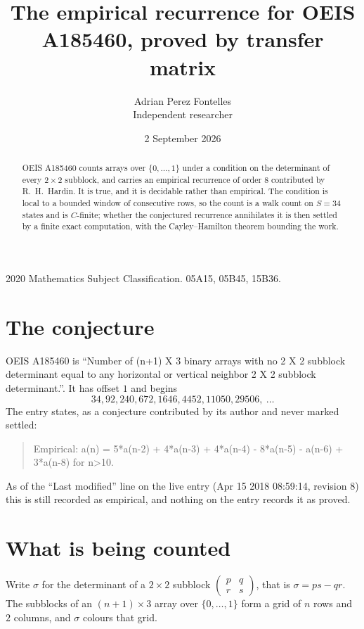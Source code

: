 \documentclass[11pt,a4paper]{article}
\title{The empirical recurrence for OEIS A185460, proved by transfer matrix}
\author{Adrian Perez Fontelles\\ \small Independent researcher}
\date{2 September 2026}
\theoremstyle{plain}
\theoremstyle{definition}
\begin{document}
\maketitle

\begin{abstract}
OEIS A185460 counts arrays over $\{0,\dots,1\}$ under a condition on the determinant of every
$2\times2$ subblock, and carries an empirical recurrence of order $8$ contributed by
R.~H.~Hardin. It is true, and it is decidable rather than empirical. The condition is local to
a bounded window of consecutive rows, so the count is a walk count on $S=34$ states and is
$C$-finite; whether the conjectured recurrence annihilates it is then settled by a finite exact
computation, with the Cayley--Hamilton theorem bounding the work.
\end{abstract}

\noindent\small 2020 Mathematics Subject Classification. 05A15, 05B45, 15B36.\normalsize

\section{The conjecture}

OEIS A185460 is ``Number of (n+1) X 3 binary arrays with no 2 X 2 subblock determinant equal to any horizontal or vertical neighbor 2 X 2 subblock determinant.''. It has offset $1$ and begins
\[
34, 92, 240, 672, 1646, 4452, 11050, 29506,\ \dots
\]
The entry states, as a conjecture contributed by its author and never marked settled:
\begin{quote}
Empirical: a(n) = 5*a(n-2) + 4*a(n-3) + 4*a(n-4) - 8*a(n-5) - a(n-6) + 3*a(n-8) for n>10.
\end{quote}
As of the ``Last modified'' line on the live entry (Apr 15 2018 08:59:14, revision 8) this is still
recorded as empirical, and nothing on the entry records it as proved.

\section{What is being counted}

Write $\sigma$ for the determinant of a $2\times2$ subblock
$\begin{pmatrix}p&q\\r&s\end{pmatrix}$, that is $\sigma=ps-qr$. The subblocks of an
$(n+1)\times3$ array over $\{0,\dots,1\}$ form a grid of $n$ rows and $2$
columns, and $\sigma$ colours that grid.
\end{document}
